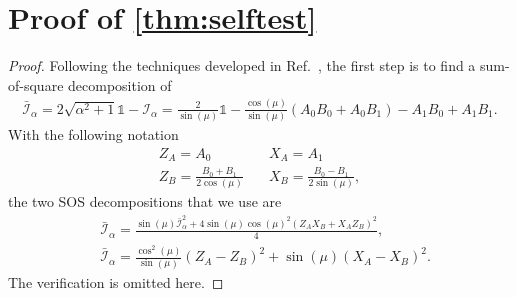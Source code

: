 \documentclass[11pt,letterpaper]{article}
\newcommand{\1}{\mathbb{1}}
\newcommand{\I}{\mathcal{I}}
\theoremstyle{definition}
\begin{document}
\section{Proof of \cref{thm:selftest} }
\label{sec:selftest}
\begin{proof}
Following the techniques developed in Ref.~\cite{bamps2015}, the first step is to find a sum-of-square decomposition of 
\begin{align}
	\bar{\I}_\alpha = 2\sqrt{\alpha^2+1} \1 - \I_\alpha
	= \frac{2}{\sin(\mu)} \1 - \frac{\cos(\mu)}{\sin(\mu)}(A_0B_0+A_0B_1) -  A_1B_0 + A_1B_1.
\end{align} 
With the following notation
\begin{align*}
	Z_A = A_0 &\quad X_A = A_1\\
	Z_B = \frac{B_0+B_1}{2\cos(\mu)} &\quad X_B = \frac{B_0-B_1}{2\sin(\mu)},
\end{align*}
the two SOS decompositions that we use are
\begin{align}
	\label{eq:sos1}&\bar{\I}_\alpha = \frac{\sin(\mu)\bar{\I}_\alpha^2 + 4\sin(\mu)\cos(\mu)^2(Z_AX_B+X_AZ_B)^2}{4},\\
	\label{eq:sos2}&\bar{\I}_\alpha = \frac{\cos^2(\mu)}{\sin(\mu)}(Z_A-Z_B)^2 + \sin(\mu) (X_A-X_B)^2.
\end{align}
The verification is omitted here.


\end{proof}
\end{document}
